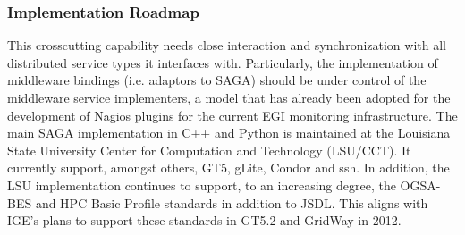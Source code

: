 \documentclass[10pt]{article}
\begin{document}
 \subsubsection{Implementation Roadmap}

  This crosscutting capability needs close interaction and
  synchronization with all distributed service types it interfaces
  with.  Particularly, the implementation of middleware bindings (i.e.
  adaptors to SAGA) should be under control of the middleware service
  implementers, a model that has already been adopted for the
  development of Nagios plugins for the current EGI monitoring
  infrastructure.  The main SAGA implementation in C++ and Python is
  maintained at the Louisiana State University Center for Computation
  and Technology (LSU/CCT).  It currently support, amongst others,
  GT5, gLite, Condor and ssh.  In addition, the LSU implementation
  continues to support, to an increasing degree, the OGSA-BES and HPC
  Basic Profile standards in addition to JSDL.  This aligns with IGE's
  plans to support these standards in GT5.2 and GridWay in 2012.  
\end{document}
